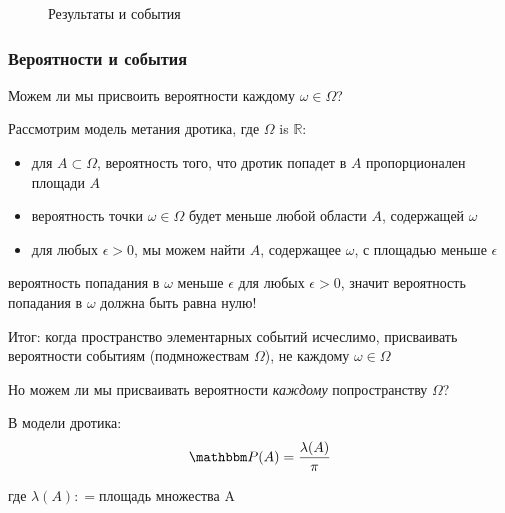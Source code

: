 \begin{frame}

    \vspace{2.5em}
    
    \begin{figure}
   \begin{center}
    \scalebox{.32}{}
    \caption{\label{f:eao} Результаты и события}
   \end{center}
    \end{figure}

\end{frame}

\begin{frame}
    \frametitle{Вероятности и события}
    
    \vspace{2em}
    Можем ли мы присвоить вероятности каждому $\omega\in \Omega$?
    
    Рассмотрим модель метания дротика, где $\Omega$ is $\mathbb{R}$:
    \begin{itemize}
        \item для $A\subset \Omega$, вероятность того, что дротик попадет в $A$  
                пропорционален площади $A$
        \item вероятность точки $\omega \in \Omega$ будет меньше 
                любой области $A$, содержащей $\omega$
        \item для любых $\epsilon>0$, мы можем найти $A$, содержащее $\omega$, 
                с площадью меньше $\epsilon$
    \end{itemize}
    
    вероятность попадания в $\omega$ меньше $\epsilon$ для 
    любых $\epsilon > 0$, значит вероятность попадания в $\omega$ должна быть равна нулю!
    
\end{frame}

\begin{frame}

    \vspace{2em}
    Итог: когда пространство элементарных событий исчеслимо, присваивать вероятности  событиям (подмножествам $\Omega$), 
    не каждому $\omega\in \Omega$
    
    Но можем ли мы присваивать вероятности \emph{каждому} попространству $\Omega$? 
    
    В модели дротика:
    \begin{equation*}
        \PP(A) = \frac{\lambda(A)}{\pi} 
    \end{equation*}
    
   где $\lambda(A)\colon = \text{площадь множества A}$

\end{frame}

